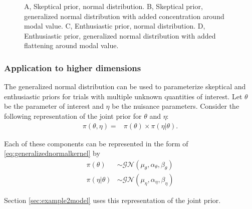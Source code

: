 \documentclass[12pt]{article}
\begin{document}
\begin{figure}
\begin{center}
\caption{A, Skeptical prior, normal distribution. B, Skeptical prior, generalized normal distribution with added concentration around modal value. C, Enthusiastic prior, normal distribution. D, Enthusiastic prior, generalized normal distribution with added flattening around modal value.}
\label{fig:figure1}
\end{center}\end{figure}

\subsubsection{Application to higher dimensions}

The generalized normal distribution can be used to parameterize skeptical and enthusiastic priors for trials with multiple unknown quantities of interest. Let $\theta$ be the parameter of interest and $\eta$ be the nuisance parameters. Consider the following representation of the joint prior for $\theta$ and $\eta$:
\begin{align}
\pi(\theta,\eta)=&\pi(\theta)\times\pi(\eta|\theta). \label{eq:generalized_normal_joint}
\end{align}

Each of these components can be represented in the form of \eqref{eq:generalizednormalkernel} by
\begin{align}
\pi(\theta)&\sim\mathcal{GN}(\mu_\theta,\alpha_\theta,\beta_\theta) \label{eq:genNormPlacebo}\\
\pi(\eta|\theta)&\sim\mathcal{GN}(\mu_\eta,\alpha_\eta,\beta_\eta) \label{eq:genNormRd}
\end{align}

Section \ref{sec:example2model} uses this representation of the joint prior.
%
%
\end{document}
